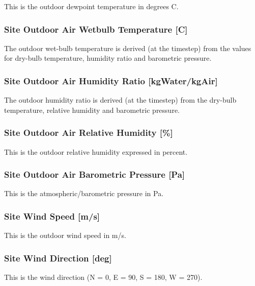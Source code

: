 This is the outdoor dewpoint temperature in degrees C.

\subsubsection{Site Outdoor Air Wetbulb Temperature {[}C{]}}\label{site-outdoor-air-wetbulb-temperature-c}

The outdoor wet-bulb temperature is derived (at the timestep) from the values for dry-bulb temperature, humidity ratio and barometric pressure.

\subsubsection{Site Outdoor Air Humidity Ratio {[}kgWater/kgAir{]}}\label{site-outdoor-air-humidity-ratio-kgwaterkgair}

The outdoor humidity ratio is derived (at the timestep) from the dry-bulb temperature, relative humidity and barometric pressure.

\subsubsection{Site Outdoor Air Relative Humidity {[}\%{]}}\label{site-outdoor-air-relative-humidity}

This is the outdoor relative humidity expressed in percent.

\subsubsection{Site Outdoor Air Barometric Pressure {[}Pa{]}}\label{site-outdoor-air-barometric-pressure-pa}

This is the atmospheric/barometric pressure in Pa.

\subsubsection{Site Wind Speed {[}m/s{]}}\label{site-wind-speed-ms}

This is the outdoor wind speed in m/s.

\subsubsection{Site Wind Direction {[}deg{]}}\label{site-wind-direction-deg}

This is the wind direction (N = 0, E = 90, S = 180, W = 270).

